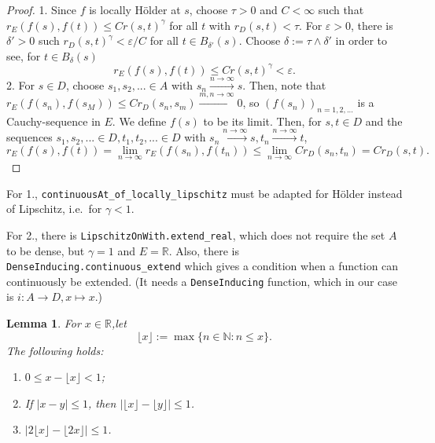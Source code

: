\documentclass{article}
\newtheorem{lemma}[proposition]{Lemma}
\theoremstyle{definition}
\theoremstyle{step} \newtheorem{step}{Step}
\newcommand{\leanline}[1]{\texttt{#1}}%
\begin{document}
\begin{proof}
  1. Since $f$ is locally Hölder at $s$, choose $\tau>0$ and
  $C<\infty$ such that $r_E(f(s), f(t)) \leq Cr(s,t)^\gamma$ for all
  $t$ with $r_D(s,t) < \tau$. For $\varepsilon>0$, there is
  $\delta'>0$ such $r_D(s,t)^\gamma < \varepsilon / C$ for all $t \in
    B_{\delta'}(s)$. Choose $\delta := \tau \wedge \delta'$ in order to
  see, for $t \in B_\delta(s)$
  $$ r_E(f(s), f(t)) \leq C r(s,t)^\gamma < \varepsilon.$$ 2. For $s
    \in D$, choose $s_1,s_2,...\in A$ with $s_n \xrightarrow{n\to\infty}
    s$. Then, note that $r_E(f(s_n), f(s_M)) \leq C r_D(s_n, s_m)
    \xrightarrow{m,n\to\infty} 0$, so $(f(s_n))_{n=1,2,...}$ is a
  Cauchy-sequence in $E$. We define $f(s)$ to be its limit. Then, for
  $s,t\in D$ and the sequences $s_1, s_2,...\in D, t_1, t_2,...\in D$
  with $s_n \xrightarrow{n\to\infty}s, t_n \xrightarrow{n\to\infty}t$,
  $$ r_E(f(s), f(t)) = \lim_{n\to\infty}r_E(f(s_n), f(t_n)) \leq
    \lim_{n\to\infty} Cr_D(s_n, t_n) = Cr_D(s,t).$$
\end{proof}

For 1., \leanline{continuousAt_of_locally_lipschitz} must be adapted
for Hölder instead of Lipschitz, i.e.\ for $\gamma<1$.

For 2., there is \leanline{LipschitzOnWith.extend_real}, which does
not require the set $A$ to be dense, but $\gamma=1$ and $E=\mathbb R$.
Also, there is \leanline{DenseInducing.continuous_extend} which gives
a condition when a function can continuously be extended. (It needs a
\leanline{DenseInducing} function, which in our case is $i : A \to D,
  x\mapsto x$.)


\begin{lemma}\label{l:gauss}
  For $x\in\mathbb R$,let
  $$ \lfloor x \rfloor := \max\{n \in \mathbb N: n\leq x\}.$$ The
  following holds:
  \begin{enumerate}
    \item $0\leq x - \lfloor x \rfloor < 1$;
    \item   If $|x-y| \leq 1$, then $|\lfloor x\rfloor - \lfloor y \rfloor| \leq
            1$.
    \item $|2 \lfloor x\rfloor - \lfloor 2x \rfloor| \leq 1$.
  \end{enumerate}
\end{lemma}
\end{document}
